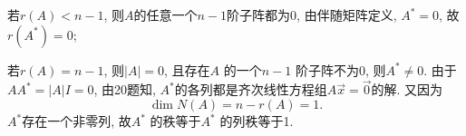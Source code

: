  若$r(A)<n-1$, 则$A$的任意一个$n-1$阶子阵都为$0$, 由伴随矩阵定义, $A^{*}=0$, 故$r(A^{*})=0$;

 若$r(A)=n-1$, 则$|A|=0$, 且存在$A$ 的一个$n-1$ 阶子阵不为0, 则$A^{*}\not=0$. 由于$AA^{*}=|A|I=0$, 由20题知, $A^{*}$的各列都是齐次线性方程组$A\vec{x}=\vec{0}$的解. 又因为
\begin{displaymath}
\dim N(A)=n-r(A)=1.\end{displaymath}
 $A^{*}$存在一个非零列, 故$A^{*}$ 的秩等于$A^{*}$ 的列秩等于1.

